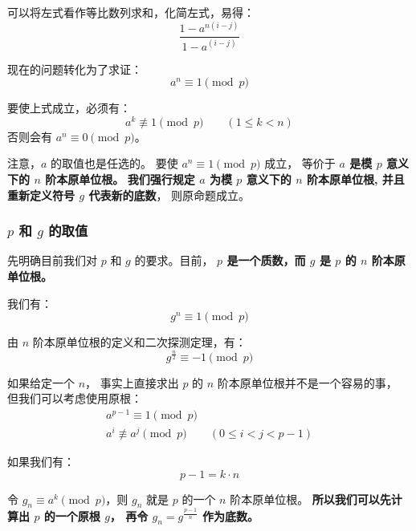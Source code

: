\documentclass[12pt, UTF8]{article}
\begin{document}
    \bigskip
    可以将左式看作等比数列求和，化简左式，易得：
    \begin{equation*}
        \frac {1 - a^{n(i - j)}} {1 - a^{(i - j)}}
    \end{equation*}

    现在的问题转化为了求证：
    \begin{equation*}
        a^n \equiv 1 \pmod {p}
    \end{equation*}

    要使上式成立，必须有：
    \begin{equation*}
        a^k \not \equiv 1 \pmod {p} \qquad (1 \le k < n)
    \end{equation*}
    否则会有 $a^n \equiv 0 \pmod {p}$。

    注意，$a$ 的取值也是任选的。
    要使 $a^n \equiv 1 \pmod {p}$ 成立，
    等价于 \textbf{$a$ 是模 $p$ 意义下的 $n$ 阶本原单位根。}
    \textbf{我们强行规定 $a$ 为模 $p$ 意义下的 $n$ 阶本原单位根,
    并且重新定义符号 $g$ 代表新的底数}，
    则原命题成立。

    \subsubsection{$p$ 和 $g$ 的取值}
    先明确目前我们对 $p$ 和 $g$ 的要求。目前，
    \textbf{$p$ 是一个质数，而 $g$ 是 $p$ 的 $n$ 阶本原单位根。}

    \bigskip
    我们有：
    \begin{equation*}
        g^n \equiv 1 \pmod {p}
    \end{equation*}

    由 $n$ 阶本原单位根的定义和二次探测定理，有：
    \begin{equation*}
        g^{\frac {n} {2}} \equiv -1 \pmod {p}
    \end{equation*}

    如果给定一个 $n$，
    事实上直接求出 $p$ 的 $n$ 阶本原单位根并不是一个容易的事，
    但我们可以考虑使用原根：
    \begin{gather*}
        a^{p - 1} \equiv 1 \pmod {p}
        \\
        a^i \not \equiv a^j \pmod {p} \qquad (0 \le i < j < p - 1)
    \end{gather*}

    如果我们有：
    \begin{equation*}
        p - 1 = k · n
    \end{equation*}

    令 $g_n \equiv a^k \pmod {p}$，则 $g_n$ 就是 $p$ 的一个 $n$ 阶本原单位根。
    \textbf{所以我们可以先计算出 $p$ 的一个原根 $g$，
    再令 $g_n = g^{\frac {p - 1} {n}}$ 作为底数。}
\end{document}
